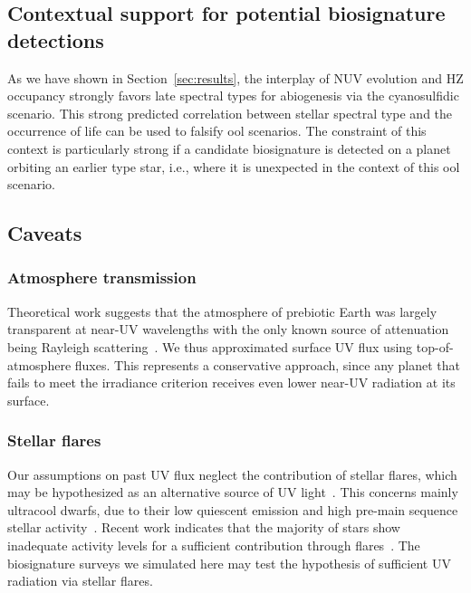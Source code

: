 \documentclass[twocolumn,twocolappendix,linenumbers]{aastex631}
\begin{document}
\subsection{Contextual support for potential biosignature detections}
As we have shown in Section~\ref{sec:results}, the interplay of \gls{NUV} evolution and \gls{HZ} occupancy strongly favors late spectral types for abiogenesis via the cyanosulfidic scenario.
This strong predicted correlation between stellar spectral type and the occurrence of life can be used to falsify \gls{ool} scenarios.
The constraint of this context is particularly strong if a candidate biosignature is detected on a planet orbiting an earlier type star, i.e., where it is unexpected in the context of this \gls{ool} scenario.



\subsection{Caveats}
\subsubsection{Atmosphere transmission}
Theoretical work suggests that the atmosphere of prebiotic Earth was largely transparent at near-UV wavelengths with the only known source of attenuation being Rayleigh scattering~\citep{Ranjan2017,Ranjan2017c}.
We thus approximated surface UV flux using top-of-atmosphere fluxes.
This represents a conservative approach, since any planet that fails to meet the irradiance criterion receives even lower near-UV radiation at its surface. 

\subsubsection{Stellar flares}
Our assumptions on past UV flux neglect the contribution of stellar flares, which may be hypothesized as an alternative source of UV light~\citep{Ranjan2017}.
This concerns mainly ultracool dwarfs, due to their low quiescent emission and high pre-main sequence stellar activity~\citep{Buccino2007,West2008}.
Recent work indicates that the majority of stars show inadequate activity levels for a sufficient contribution through flares~\citep{Glazier2020,Ducrot2020,Guenther2020}.
The biosignature surveys we simulated here may test the hypothesis of sufficient UV radiation via stellar flares.
\end{document}
